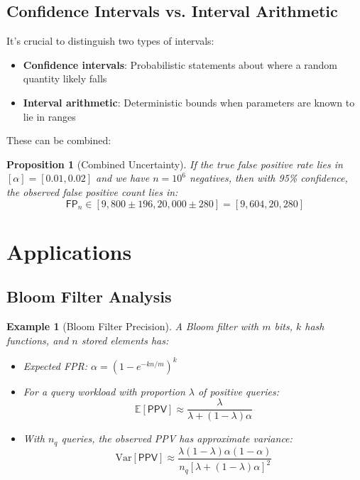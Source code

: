 \documentclass[11pt,final,hidelinks]{article}
\newtheorem{proposition}[theorem]{Proposition}
\newtheorem{example}[theorem]{Example}
\newcommand{\Expect}[1]{\mathbb{E}\left[#1\right]}
\newcommand{\Var}[1]{\mathrm{Var}\left[#1\right]}
\newcommand{\FP}{\mathsf{FP}}  %
\newcommand{\PPV}{\mathsf{PPV}}  %
\newcommand{\fprate}{\alpha}
\begin{document}
\subsection{Confidence Intervals vs. Interval Arithmetic}

It's crucial to distinguish two types of intervals:

\begin{itemize}
    \item \textbf{Confidence intervals}: Probabilistic statements about where a random quantity likely falls
    \item \textbf{Interval arithmetic}: Deterministic bounds when parameters are known to lie in ranges
\end{itemize}

These can be combined:

\begin{proposition}[Combined Uncertainty]
If the true false positive rate lies in $[\fprate] = [0.01, 0.02]$ and we have $n = 10^6$ negatives, then with 95\% confidence, the observed false positive count lies in:
\begin{equation}
\FP_n \in [9,800 \pm 196, 20,000 \pm 280] = [9,604, 20,280]
\end{equation}
\end{proposition}

\section{Applications}

\subsection{Bloom Filter Analysis}

\begin{example}[Bloom Filter Precision]
A Bloom filter with $m$ bits, $k$ hash functions, and $n$ stored elements has:
\begin{itemize}
    \item Expected FPR: $\fprate = (1 - e^{-kn/m})^k$
    \item For a query workload with proportion $\lambda$ of positive queries:
    \begin{equation}
    \Expect{\PPV} \approx \frac{\lambda}{\lambda + (1-\lambda)\fprate}
    \end{equation}
    \item With $n_q$ queries, the observed PPV has approximate variance:
    \begin{equation}
    \Var{\PPV} \approx \frac{\lambda(1-\lambda)\fprate(1-\fprate)}{n_q[\lambda + (1-\lambda)\fprate]^2}
    \end{equation}
\end{itemize}
\end{example}
\end{document}
